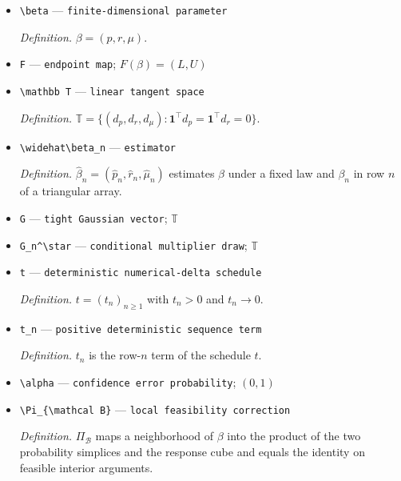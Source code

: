 \documentclass{article}
\begin{document}
\begin{itemize}
  \par\smallskip\noindent\emph{Definition.} \(\mathcal D_U=\{(a,b):a_c+b_x\ge\mu_{cx},\ p^\top a+r^\top b=U,\ p^\top a=0\}\).
  \item \texttt{\textbackslash{}\allowbreak{}beta} --- \texttt{finite-\allowbreak{}dimensional parameter}
  \par\smallskip\noindent\emph{Definition.} \(\beta=(p,r,\mu)\).
  \item \texttt{F} --- \texttt{endpoint map}; \(F(\beta)=(L,U)\)
  \item \texttt{\textbackslash{}\allowbreak{}mathbb T} --- \texttt{linear tangent space}
  \par\smallskip\noindent\emph{Definition.} \(\mathbb T=\{(d_p,d_r,d_\mu):\mathbf 1^\top d_p=\mathbf 1^\top d_r=0\}\).
  \item \texttt{\textbackslash{}\allowbreak{}widehat\textbackslash{}\allowbreak{}beta\_\allowbreak{}n} --- \texttt{estimator}
  \par\smallskip\noindent\emph{Definition.} \(\widehat\beta_n=(\widehat p_n,\widehat r_n,\widehat\mu_n)\) estimates \(\beta\) under a fixed law and \(\beta_n\) in row \(n\) of a triangular array.
  \item \texttt{G} --- \texttt{tight Gaussian vector}; \(\mathbb T\)
  \item \texttt{G\_\allowbreak{}n\textasciicircum{}\textbackslash{}\allowbreak{}star} --- \texttt{conditional multiplier draw}; \(\mathbb T\)
  \item \texttt{t} --- \texttt{deterministic numerical-\allowbreak{}delta schedule}
  \par\smallskip\noindent\emph{Definition.} \(t=(t_n)_{n\ge1}\) with \(t_n>0\) and \(t_n\to0\).
  \item \texttt{t\_\allowbreak{}n} --- \texttt{positive deterministic sequence term}
  \par\smallskip\noindent\emph{Definition.} \(t_n\) is the row-\(n\) term of the schedule \(t\).
  \item \texttt{\textbackslash{}\allowbreak{}alpha} --- \texttt{confidence error probability}; \((0,1)\)
  \item \texttt{\textbackslash{}\allowbreak{}Pi\_\allowbreak{}\{\textbackslash{}\allowbreak{}mathcal B\}\allowbreak{}} --- \texttt{local feasibility correction}
  \par\smallskip\noindent\emph{Definition.} \(\Pi_{\mathcal B}\) maps a neighborhood of \(\beta\) into the product of the two probability simplices and the response cube and equals the identity on feasible interior arguments.

\end{itemize}
\end{document}
